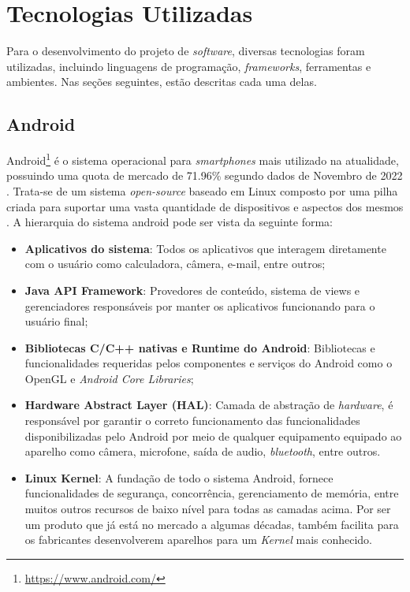 \section{Tecnologias Utilizadas}

Para o desenvolvimento do projeto de \textit{software}, diversas tecnologias foram utilizadas, incluindo linguagens de programação, \textit{frameworks}, ferramentas e ambientes. Nas seções seguintes, estão descritas cada uma delas.

\subsection{Android}

Android\footnote{\url{https://www.android.com/}} é o sistema operacional para \textit{smartphones} mais utilizado na atualidade, possuindo uma quota de mercado de 71.96\% segundo dados de Novembro de 2022 \cite{mobile-os}. Trata-se de um sistema \textit{open-source} baseado em Linux composto por uma pilha criada para suportar uma vasta quantidade de dispositivos e aspectos dos mesmos \cite{android}. A hierarquia do sistema android pode ser vista da seguinte forma:

\begin{itemize}
    \item \textbf{Aplicativos do sistema}: Todos os aplicativos que interagem diretamente com o usuário como calculadora, câmera, e-mail, entre outros;
    \item \textbf{Java API Framework}: Provedores de conteúdo, sistema de views e gerenciadores responsáveis por manter os aplicativos funcionando para o usuário final;
    \item \textbf{Bibliotecas C/C++ nativas e Runtime do Android}: Bibliotecas e funcionalidades requeridas pelos componentes e serviços do Android como o OpenGL e \textit{Android Core Libraries};
    \item \textbf{Hardware Abstract Layer (HAL)}: Camada de abstração de \textit{hardware}, é responsável por garantir o correto funcionamento das funcionalidades disponibilizadas pelo Android por meio de qualquer equipamento equipado ao aparelho como câmera, microfone, saída de audio, \textit{bluetooth}, entre outros.
    \item \textbf{Linux Kernel}: A fundação de todo o sistema Android, fornece funcionalidades de segurança, concorrência, gerenciamento de memória, entre muitos outros recursos de baixo nível para todas as camadas acima. Por ser um produto que já está no mercado a algumas décadas, também facilita para os fabricantes desenvolverem aparelhos para um \textit{Kernel} mais conhecido.
\end{itemize}

